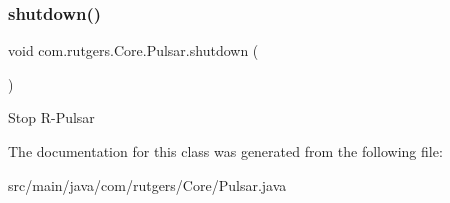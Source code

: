 \subsubsection{\texorpdfstring{shutdown()}{shutdown()}}
{\footnotesize\ttfamily void com.\+rutgers.\+Core.\+Pulsar.\+shutdown (\begin{DoxyParamCaption}{ }\end{DoxyParamCaption})}

Stop R-\/\+Pulsar 

The documentation for this class was generated from the following file\+:\begin{DoxyCompactItemize}
\item 
src/main/java/com/rutgers/\+Core/Pulsar.\+java\end{DoxyCompactItemize}

